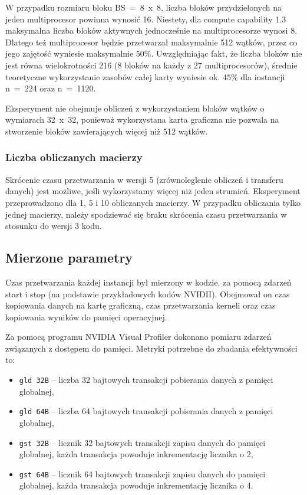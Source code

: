 \documentclass[12pt,a4paper]{article}
\begin{document}
W przypadku rozmiaru bloku  BS~=~8~x~8, liczba bloków przydzielonych na jeden multiprocesor powinna wynosić 16. Niestety, dla compute capability 1.3 maksymalna liczba bloków aktywnych jednocześnie na multiprocesorze wynosi 8. Dlatego też multiprocesor będzie przetwarzał maksymalnie 512 wątków, przez co jego zajętość wyniesie maksymalnie $50\%$.  Uwzględniając fakt, że liczba bloków nie jest równa wielokrotności 216 (8 bloków na każdy z 27 multiprocesorów), średnie teoretyczne wykorzystanie zasobów całej karty wyniesie ok. $45\%$ dla instancji n~=~224 oraz n~=~1120.

Eksperyment nie obejmuje obliczeń z wykorzystaniem bloków wątków o wymiarach 32~x~32, ponieważ wykorzystana karta graficzna nie pozwala na stworzenie bloków zawierających więcej niż 512 wątków.


\subsubsection*{Liczba obliczanych macierzy}

Skrócenie czasu przetwarzania w wersji 5 (zrównoleglenie obliczeń i transferu danych) jest możliwe, jeśli wykorzystamy więcej niż jeden strumień. Eksperyment przeprowadzono dla 1, 5 i 10 obliczanych macierzy. W przypadku obliczania tylko jednej macierzy, należy spodziewać się braku skrócenia czasu przetwarzania w stosunku do wersji 3 kodu.

\subsection{Mierzone parametry}

Czas przetwarzania każdej instancji był mierzony w kodzie, za pomocą zdarzeń start i stop (na podstawie przykładowych kodów NVIDII). Obejmował on czas kopiowania danych na kartę graficzną, czas przetwarzania kerneli oraz czas kopiowania wyników do pamięci operacyjnej.

Za pomocą programu NVIDIA Visual Profiler dokonano pomiaru zdarzeń związanych z dostępem do pamięci. Metryki potrzebne do zbadania efektywności to: 
\begin{itemize}
\item \verb|gld 32B| -- liczba 32 bajtowych transakcji pobierania danych z pamięci globalnej,
\item \verb|gld 64B| -- liczba 64 bajtowych transakcji pobierania danych z pamięci globalnej,
\item \verb|gst 32B| -- licznik 32 bajtowych transakcji zapisu danych do pamięci globalnej, każda transakcja powoduje inkrementację licznika o 2,
\item \verb|gst 64B| -- licznik 64 bajtowych transakcji zapisu danych do pamięci globalnej, każda transakcja powoduje inkrementację licznika o 4.
\end{itemize}
\end{document}
